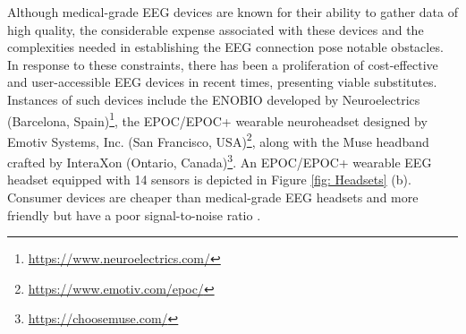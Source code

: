 Although medical-grade EEG devices are known for their ability to gather data of high quality, the considerable expense associated with these devices and the complexities needed in establishing the EEG connection pose notable obstacles. In response to these constraints, there has been a proliferation of cost-effective and user-accessible EEG devices in recent times, presenting viable substitutes. Instances of such devices include the ENOBIO developed by Neuroelectrics (Barcelona, Spain)\footnote{\url{https://www.neuroelectrics.com/}}, the EPOC/EPOC+ wearable neuroheadset designed by Emotiv Systems, Inc. (San Francisco, USA)\footnote{\url{https://www.emotiv.com/epoc/}}, along with the Muse headband crafted by InteraXon (Ontario, Canada)\footnote{\url{https://choosemuse.com/}}. An EPOC/EPOC+ wearable EEG headset equipped with 14 sensors is depicted in Figure \ref{fig: Headsets} (b). Consumer devices are cheaper than medical-grade EEG headsets and more friendly but have a poor signal-to-noise ratio \cite{survey_brain_biometrics}. 




